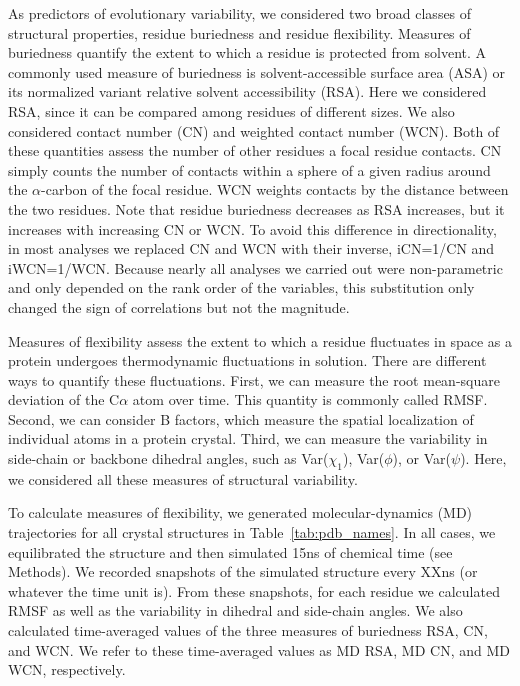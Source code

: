 \documentclass[12pt]{article}
\begin{document}
As predictors of evolutionary variability, we considered two broad classes of structural properties, residue buriedness and residue flexibility. Measures of buriedness quantify the extent to which a residue is protected from solvent. A commonly used measure of buriedness is solvent-accessible surface area (ASA) or its normalized variant relative solvent accessibility (RSA). Here we considered RSA, since it can be compared among residues of different sizes. We also considered contact number (CN) and weighted contact number (WCN). Both of these quantities assess the number of other residues a focal residue contacts. CN simply counts the number of contacts within a sphere of a given radius around the $\alpha$-carbon of the focal residue. WCN weights contacts by the distance between the two residues. Note that residue buriedness decreases as RSA increases, but it increases with increasing CN or WCN. To avoid this difference in directionality, in most analyses we replaced CN and WCN with their inverse, iCN=1/CN and iWCN=1/WCN. Because nearly all analyses we carried out were non-parametric and only depended on the rank order of the variables, this substitution only changed the sign of correlations but not the magnitude.

Measures of flexibility assess the extent to which a residue fluctuates in space as a protein undergoes thermodynamic fluctuations in solution. There are different ways to quantify these fluctuations. First, we can measure the root mean-square deviation of the C$\alpha$ atom over time. This quantity is commonly called RMSF. Second, we can consider B factors, which measure the spatial localization of individual atoms in a protein crystal. Third, we can measure the variability in side-chain or backbone dihedral angles, such as Var($\chi_1$), Var($\phi$), or Var($\psi$). Here, we considered all these measures of structural variability.

To calculate measures of flexibility, we generated molecular-dynamics (MD) trajectories for all crystal structures in Table~\ref{tab:pdb_names}. In all cases, we equilibrated the structure and then simulated 15ns of chemical time (see Methods). We recorded snapshots of the simulated structure every {\color{red}XXns (or whatever the time unit is)}. From these snapshots, for each residue we calculated RMSF as well as the variability in dihedral and side-chain angles. We also calculated time-averaged values of the three measures of buriedness RSA, CN, and WCN. We refer to these time-averaged values as MD RSA, MD CN, and MD WCN, respectively.
\end{document}
